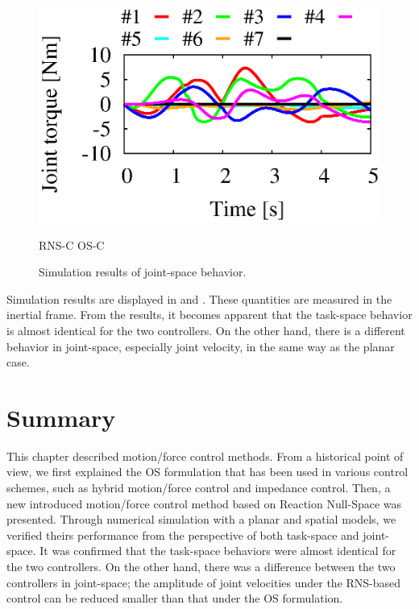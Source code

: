 \begin{figure}[t]
\begin{minipage}[h]{0.40\linewidth}
  \end{minipage}
  \begin{minipage}[h]{0.40\linewidth}
    \centering
    \includegraphics[width=1.0\linewidth]{fig/chapter6/results/spatial/OSF/OSF_U01_joint_torque_1-4.eps}
  \end{minipage}
  \footnotesize\par{RNS-C \hspace{13em} OS-C}
  \vspace{1em}
  \caption{Simulation results of joint-space behavior.}
  \label{fig:RES_MF_7R_JOINT}
\end{figure}
%

Simulation results are displayed in  and .
These quantities are measured in the inertial frame.
From the results, it becomes apparent that the task-space behavior is almost identical for the two controllers.
On the other hand, there is a different behavior in joint-space, especially joint velocity,
in the same way as the planar case.


\section{Summary}
This chapter described motion/force control methods.
From a historical point of view,
we first explained the OS formulation that has been used in various control schemes,
such as hybrid motion/force control and impedance control.
Then, a new introduced motion/force control method based on Reaction Null-Space was presented.
Through numerical simulation with a planar and spatial models,
we verified theirs performance from the perspective of both task-space and joint-space.
It was confirmed that the task-space behaviors were almost identical for the two controllers.
On the other hand,
there was a difference between the two controllers in joint-space;
the amplitude of joint velocities under the RNS-based control can be
reduced smaller than that under the OS formulation.






%
%
